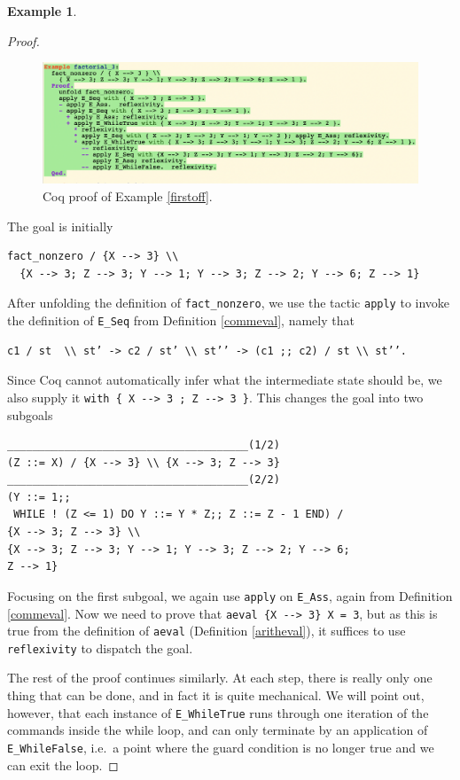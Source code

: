 \documentclass[12pt,notitlepage]{report}
\theoremstyle{plain}
\theoremstyle{definition}
\newtheorem{example}[theo]{Example}
\numberwithin{equation}{section}
\begin{document}
\begin{example}
\begin{proof}
        \noindent
        \begin{figure}[H]
        \centering
        \includegraphics[scale=0.5]{factorial_3}
        \caption{Coq proof of Example \ref{firstoff}.}
        \label{fig:firstoff}
        \end{figure}
        \par\noindent The goal is initially
        \begin{verbatim}fact_nonzero / {X --> 3} \\
  {X --> 3; Z --> 3; Y --> 1; Y --> 3; Z --> 2; Y --> 6; Z --> 1}\end{verbatim}
        After unfolding the definition of \verb$fact_nonzero$, we use the tactic \verb$apply$ to invoke the definition of \verb$E_Seq$ from Definition \ref{commeval}, namely that
        \begin{verbatim}
c1 / st  \\ st’ -> c2 / st’ \\ st’’ -> (c1 ;; c2) / st \\ st’’. \end{verbatim}
       Since Coq cannot automatically infer what the intermediate state should be, we also supply it \verb$with { X --> 3 ; Z --> 3 }$.  This changes the goal into two subgoals
       \begin{verbatim}
______________________________________(1/2)
(Z ::= X) / {X --> 3} \\ {X --> 3; Z --> 3}
______________________________________(2/2)
(Y ::= 1;;
 WHILE ! (Z <= 1) DO Y ::= Y * Z;; Z ::= Z - 1 END) /
{X --> 3; Z --> 3} \\
{X --> 3; Z --> 3; Y --> 1; Y --> 3; Z --> 2; Y --> 6;
Z --> 1}
       \end{verbatim}
       Focusing on the first subgoal, we again use \verb$apply$ on \verb$E_Ass$, again from Definition \ref{commeval}.  Now we need to prove that 
       \verb$aeval {X --> 3} X = 3$, but as this is true from the definition of \verb$aeval$ (Definition \ref{aritheval}), it suffices to use \verb$reflexivity$ to dispatch the goal.
       \par The rest of the proof continues similarly.  At each step, there is really only one thing that can be done, and in fact it is quite mechanical.  We will point out, however, that each instance of \verb$E_WhileTrue$ runs through one iteration of the commands inside the while loop, and can only terminate by an application of \verb$E_WhileFalse$, i.e.\ a point where the guard condition is no longer true and we can exit the loop.
    \end{proof}
\end{example}
\end{document}
